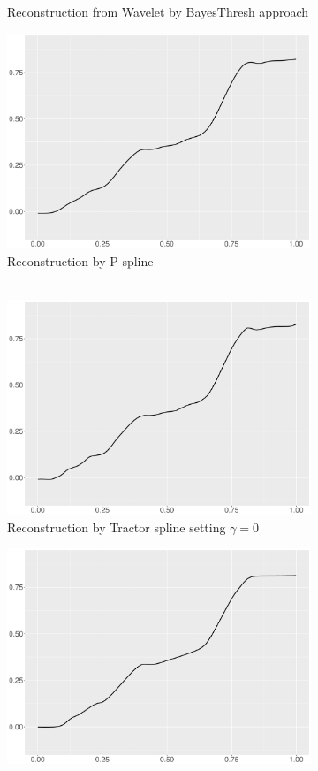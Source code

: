 \begin{figure}
\begin{subfigure}{0.45\textwidth}
    \caption{Reconstruction from Wavelet by BayesThresh approach}
    \end{subfigure}
    \begin{subfigure}{0.45\textwidth}
    \centering
    \includegraphics[width=\linewidth,height=0.45\textwidth]{Chapters/02TractorSplineTheory/plot/ggplot/ggBlocksPSpline.pdf}
    \caption{Reconstruction by P-spline \\\mbox{  } }
    \end{subfigure}
    \begin{subfigure}{0.45\textwidth}
    \centering
    \includegraphics[width=\linewidth,height=0.45\textwidth]{Chapters/02TractorSplineTheory/plot/ggplot/ggBlocksGamma.pdf}
    \caption{Reconstruction by Tractor spline setting $\gamma=0$}
    \end{subfigure}
  \begin{subfigure}{0.45\textwidth}
    \centering
    \includegraphics[width=\linewidth,height=0.45\textwidth]{Chapters/02TractorSplineTheory/plot/ggplot/ggBlocksTractorAPT.pdf}

\end{subfigure}
\end{figure}
